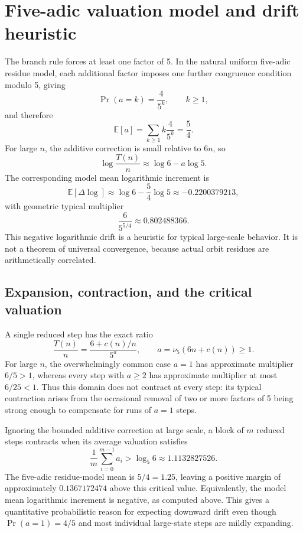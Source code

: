\documentclass[11pt]{article}
\begin{document}
\section{Five-adic valuation model and drift heuristic}
The branch rule forces at least one factor of 5. In the natural uniform five-adic residue model, each additional factor imposes one further congruence condition modulo 5, giving
\begin{equation}
\Pr(a=k)=\frac{4}{5^k},\qquad k\ge1,
\end{equation}
and therefore
\begin{equation}
\mathbb{E}[a]=\sum_{k\ge1}k\frac{4}{5^k}=\frac54.
\end{equation}
For large $n$, the additive correction is small relative to $6n$, so
\[
\log\frac{T(n)}{n}\approx\log6-a\log5.
\]
The corresponding model mean logarithmic increment is
\begin{equation}
\mathbb{E}[\Delta\log]\approx\log6-\frac54\log5\approx-0.2200379213,
\end{equation}
with geometric typical multiplier
\[
\frac{6}{5^{5/4}}\approx0.802488366.
\]
This negative logarithmic drift is a heuristic for typical large-scale behavior. It is not a theorem of universal convergence, because actual orbit residues are arithmetically correlated.

\subsection*{Expansion, contraction, and the critical valuation}
A single reduced step has the exact ratio
\begin{equation}
\frac{T(n)}{n}=\frac{6+c(n)/n}{5^a},\qquad a=\nu_5(6n+c(n))\ge1.
\end{equation}
For large $n$, the overwhelmingly common case $a=1$ has approximate multiplier $6/5>1$, whereas every step with $a\ge2$ has approximate multiplier at most $6/25<1$. Thus this domain does not contract at every step: its typical contraction arises from the occasional removal of two or more factors of 5 being strong enough to compensate for runs of $a=1$ steps.

Ignoring the bounded additive correction at large scale, a block of $m$ reduced steps contracts when its average valuation satisfies
\begin{equation}
\frac1m\sum_{i=0}^{m-1}a_i>\log_5 6\approx1.1132827526.
\end{equation}
The five-adic residue-model mean is $5/4=1.25$, leaving a positive margin of approximately $0.1367172474$ above this critical value. Equivalently, the model mean logarithmic increment is negative, as computed above. This gives a quantitative probabilistic reason for expecting downward drift even though $\Pr(a=1)=4/5$ and most individual large-state steps are mildly expanding.
\end{document}
